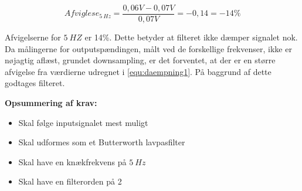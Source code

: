 \begin{equation} \label{equ:afvigelse1}
Afviglese_{5~Hz} = \frac{0,06V-0,07V}{0,07V} = -0,14  = - 14 \%
\end{equation}

\noindent 
Afvigelserne for $5~HZ$ er 14\%. Dette betyder at filteret ikke dæmper signalet nok. Da målingerne for outputspændingen, målt ved de forskellige frekvenser, ikke er nøjagtig aflæst, grundet downsampling, er det forventet, at der er en større afvigelse fra værdierne udregnet i \autoref{equ:daempning1}. På baggrund af dette godtages filteret. 

\vspace{3mm}
\textbf{Opsummering af krav:}
\begin{itemize}
\item[\text{\sffamily \checkmark}] Skal følge inputsignalet mest muligt  
\item[\text{\sffamily \checkmark}] Skal udformes som et Butterworth lavpasfilter
\item[\text{\sffamily \checkmark}] Skal have en knækfrekvens på $5~Hz$
\item[\text{\sffamily \checkmark}] Skal have en filterorden på 2
\end{itemize}